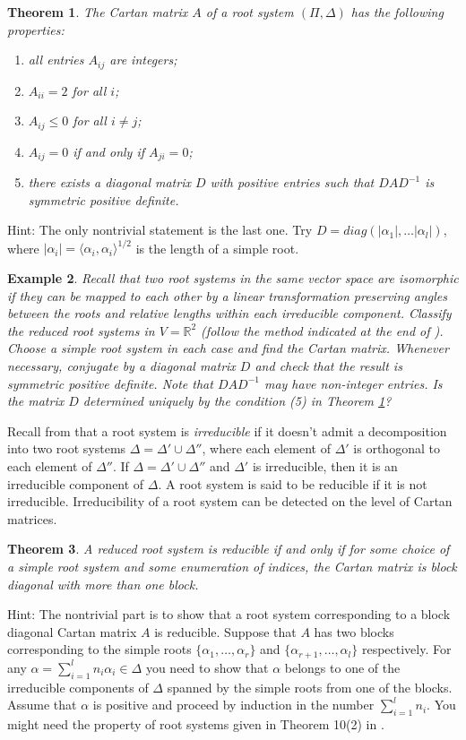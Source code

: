 \documentclass[11pt]{amsart}
\newcommand{\R}{\mathbb R}
\newtheorem{theorem}{Theorem}
\newtheorem{example}[theorem]{Example}
\begin{document}
\begin{theorem} \label{A}
The Cartan matrix $A$ of a root system $(\Pi, \Delta)$ has 
the following properties: 
\begin{enumerate} 
\item{all entries $A_{ij}$ are integers;}
\item{$A_{ii}=2$ for all $i$;}
\item{$A_{ij} \leq 0$ for all $i \neq j$;}
\item{$A_{ij}=0$ if and only if $A_{ji}=0$;}
\item{there exists a diagonal matrix $D$ with positive entries such 
that $DAD^{-1}$ is symmetric positive definite.}
\end{enumerate}
\end{theorem} 
Hint: The only nontrivial statement is the last one. Try 
$D= diag(|\alpha_1|, \ldots |\alpha_l| )$, where $|\alpha_i|= 
\langle \alpha_i, \alpha_i \rangle^{1/2}$ is the length of a simple root.

\begin{example} Recall that two root systems in the same vector space 
are \emph{isomorphic} if they can be mapped to each other by a linear  
transformation preserving angles between the 
roots and relative lengths within each irreducible component. 
Classify the reduced root systems in $V= \R^2$ 
(follow the method indicated at the end of \cite{1}). Choose a 
simple root system in each case and find the Cartan matrix. Whenever 
necessary, conjugate by a diagonal matrix $D$ and check that the result 
is symmetric positive definite. Note that $DAD^{-1}$ may have non-integer 
entries. Is the matrix $D$ determined uniquely by the condition (5) in 
Theorem \ref{A}?
\end{example} 

Recall from \cite{1} that a root system is \emph{irreducible} if it 
doesn't admit a decomposition into two root systems 
$\Delta = \Delta' \cup \Delta''$, where each element of $\Delta' $ 
is orthogonal to each element of $\Delta''$. If $\Delta = \Delta' \cup 
\Delta''$ and $\Delta'$ is irreducible, then it is an irreducible component 
of $\Delta$. A root system is said to be reducible if it is not irreducible. 
Irreducibility of a root system can be detected on the level of Cartan 
matrices. 


\begin{theorem} A reduced root system is reducible if and only if 
for some choice of a simple root system and some enumeration of indices, 
the Cartan matrix is block diagonal with more than one block. 
\end{theorem} 
Hint:  The nontrivial part is to show that a root 
system corresponding to a block diagonal Cartan matrix $A$ is reducible. 
Suppose that $A$ has two blocks corresponding to the simple roots 
$\{\alpha_1, \ldots, \alpha_r \}$ and $\{\alpha_{r+1}, \ldots, \alpha_l\}$ 
respectively.  
For any $\alpha =\sum_{i=1}^l n_i \alpha_i \in \Delta $ you need to 
show that $\alpha$ belongs to one of the irreducible components of $\Delta$ 
spanned by the simple 
roots from one of the blocks. Assume that $\alpha$ is positive and proceed 
by induction in the number $\sum_{i=1}^l n_i$. You might need the property 
of root systems given in Theorem 10(2) in \cite{1}. 
\end{document}
